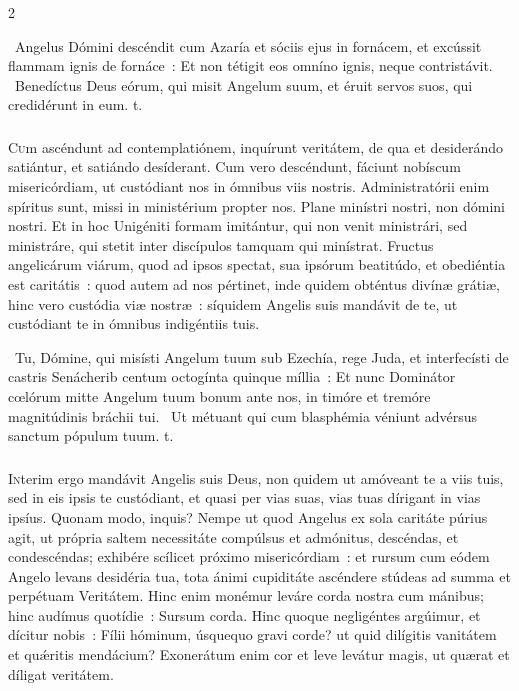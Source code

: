 \documentclass[9pt,twoside]{extarticle}
\begin{document}
\begin{multicols}{2}
{\begin{tightlist}{}
\item {}~Angelus Dómini descéndit cum Azaría et sóciis ejus in fornácem, et excússit flammam ignis de fornáce~: \textred{*} Et non tétigit eos omníno ignis, neque contristávit. ~Benedíctus Deus eórum, qui misit Angelum suum, et éruit servos suos, qui credidérunt in eum. t.
\end{tightlist}

\subsubsection*{\center {}}
\lettrine{C}um ascéndunt ad contemplatiónem, inquírunt veritátem, de qua et desiderándo satiántur, et satiándo desíderant. Cum vero descéndunt, fáciunt nobíscum misericórdiam, ut custódiant nos in ómnibus viis nostris. Administratórii enim spíritus sunt, missi in ministérium propter nos. Plane minístri nostri, non dómini nostri. Et in hoc Unigéniti formam imitántur, qui non venit ministrári, sed ministráre, qui stetit inter discípulos tamquam qui minístrat. Fructus angelicárum viárum, quod ad ipsos spectat, sua ipsórum beatitúdo, et obediéntia est caritátis~: quod autem ad nos pértinet, inde quidem obténtus divínæ grátiæ, hinc vero custódia viæ nostræ~: síquidem Angelis suis mandávit de te, ut custódiant te in ómnibus indigéntiis tuis.

\begin{tightlist}{}
\item {}~Tu, Dómine, qui misísti Angelum tuum sub Ezechía, rege Juda, et interfecísti de castris Senácherib centum octogínta quinque míllia~: \textred{*} Et nunc Dominátor cœlórum mitte Angelum tuum bonum ante nos, in timóre et tremóre magnitúdinis bráchii tui. ~Ut métuant qui cum blasphémia véniunt advérsus sanctum pópulum tuum. t.
\end{tightlist}

\subsubsection*{\center {}}
\lettrine{I}nterim ergo mandávit Angelis suis Deus, non quidem ut amóveant te a viis tuis, sed in eis ipsis te custódiant, et quasi per vias suas, vias tuas dírigant in vias ipsíus. Quonam modo, inquis? Nempe ut quod Angelus ex sola caritáte púrius agit, ut própria saltem necessitáte compúlsus et admónitus, descéndas, et condescéndas; exhibére scílicet próximo misericórdiam~: et rursum cum eódem Angelo levans desidéria tua, tota ánimi cupiditáte ascéndere stúdeas ad summa et perpétuam Veritátem. Hinc enim monémur leváre corda nostra cum mánibus; hinc audímus quotídie~: Sursum corda. Hinc quoque negligéntes argúimur, et dícitur nobis~: Fílii hóminum, úsquequo gravi corde? ut quid dilígitis vanitátem et quǽritis mendácium? Exonerátum enim cor et leve levátur magis, ut quærat et díligat veritátem.

}
\end{multicols}
\end{document}
